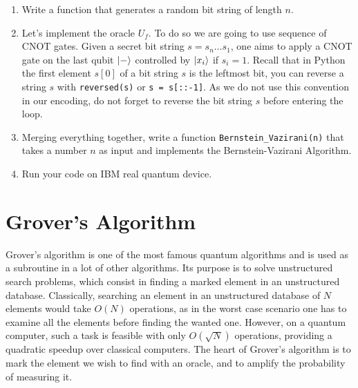 \documentclass{article}
\begin{document}
\begin{enumerate}
    \item Write a function that generates a random bit string of length $n$.
    \item Let's implement the oracle $U_f$. To do so we are going to use sequence of CNOT gates. Given a secret bit string $s=s_n\dots s_1$, one aims to apply a CNOT gate on the last qubit $\ket{-}$ controlled by $\ket{x_i}$ if $s_i=1$. Recall that in Python the first element $s[0]$ of a bit string $s$ is the leftmost bit, you can reverse a string $s$ with \verb|reversed(s)| or \verb|s = s[::-1]|. As we do not use this convention in our encoding, do not forget to reverse the bit string $s$ before entering the loop.
    
    \item Merging everything together, write a function \verb|Bernstein_Vazirani(n)| that takes a number $n$ as input and implements the Bernstein-Vazirani Algorithm.
    \item Run your code on IBM real quantum device.
\end{enumerate}

\section{Grover's Algorithm}

Grover's algorithm \cite{grover1996fast} is one of the most famous quantum algorithms and is used as a subroutine in a lot of other algorithms. Its purpose is to solve unstructured search problems, which consist in finding a marked element in an unstructured database. Classically, searching an element in an unstructured database of $N$ elements would take $O(N)$ operations, as in the worst case scenario one has to examine all the elements before finding the wanted one. However, on a quantum computer, such a task is feasible with only $O(\sqrt{N})$ operations, providing a quadratic speedup over classical computers. The heart of Grover's algorithm is to mark the element we wish to find with an oracle, and to amplify the probability of measuring it.
\end{document}
